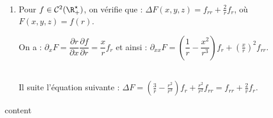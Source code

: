 \documentclass[12pt,a4paper]{article}
\begin{document}
	\begin{sol}$ $\\
		\begin{enumerate}
			\item Pour $f \in \mathcal C^2(\R_+^\star)$, on vérifie que : $\Delta F(x,y,z) = f_{rr} + \frac2r f_r$, où $F(x,y,z) = f(r)$.\\
			\begin{minipage}[t]{15cm}
				On a : $\partial_x F = \dfrac{\partial r}{\partial x}\dfrac{\partial f}{\partial r} = \dfrac xr f_r$ et ainsi : $\partial_{xx} F = \left(\dfrac1r - \dfrac {x^2}{r^3}\right)f_r + \left(\frac{x}{r}\right)^2f_{rr}$.
			\end{minipage}\\
			Il suite l'équation suivante : $\Delta F = \left(\frac 3r - \frac{r^2}{r^3}\right)f_r + \frac{r^2}{r^2} f_{rr} = f_{rr} + \frac2rf_r$.
		\end{enumerate}
	\end{sol}
	
	\begin{sol}
		content
	\end{sol}
	
\end{document}
